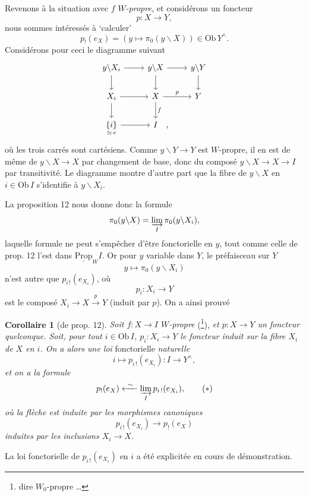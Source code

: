 Revenons à la situation avec $f$ \textit{$W$-propre,} et considérons un foncteur
\[
p : X \longrightarrow Y,
\]
nous sommes intéressés à ‘calculer’
\[
p_!(e_X) = (y \longmapsto \pi_0(y\backslash X)) \in \mathrm{Ob}\, Y^\wedge.
\]
Considérons pour ceci le diagramme suivant
\[
\begin{tikzcd}
y\backslash X_i \arrow[r] \arrow[d] & y\backslash X \arrow[r] \arrow[d] & y\backslash Y \arrow[d] \\
X_i \arrow[r] \arrow[d] & X \arrow[r, "p"] \arrow[d, "f"] & Y \\
\underset{\simeq\, e}{\{i\}} \arrow[r] & I\rlap{\quad ,} &
\end{tikzcd}
\]
où les trois carrés sont cartésiens. Comme $y\backslash Y \longrightarrow Y$ est $W$-propre, il en est de même de $y\backslash X \longrightarrow X$ par changement de base, donc du composé $y\backslash X \longrightarrow X \longrightarrow I$ par transitivité. Le diagramme montre d'autre part que la fibre de $y\backslash X$ en $i \in \mathrm{Ob}\, I$ s'identifie à $y\backslash X_i$.

La proposition 12 nous donne donc la formule
\[
\pi_0(y\backslash X) = \varinjlim_{I} \pi_0(y\backslash X_i),
\]
laquelle formule ne peut s'empêcher d'être fonctorielle en $y$, tout comme celle de prop. 12 l'est dans $\underline{\mathrm{Prop}}_W I$. Or pour $y$ variable dans $Y$, le préfaisceau sur $Y$
\[
y \longmapsto \pi_0(y\backslash X_i)
\]
n'est autre que $p_{i\,!}(e_{X_i})$, où
\[
p_i : X_i \longrightarrow Y
\]
est le composé $X_i \longrightarrow X \xrightarrow{p} Y$ (induit par $p$). On a ainsi prouvé

\textbf{Corollaire 1} (de prop. 12). \textit{Soit $f : X \longrightarrow I$ $W$-propre} (\footnote[82]{dire $W_0$-propre \dots}), \textit{et $p : X \longrightarrow Y$ un foncteur quelconque. Soit, pour tout $i \in \mathrm{Ob}\, I$, $p_i : X_i \longrightarrow Y$ le foncteur induit sur la fibre $X_i$ de $X$ en $i$. On a alors une loi} fonctorielle \textit{naturelle}
\[
i \longmapsto p_{i\,!}(e_{X_i}) : I \longrightarrow Y^\wedge,
\]
\textit{et on a la formule}
\[
p_!(e_X) \xleftarrow{\ \sim\ } \varinjlim_{I} p_{i\,!}(e_{X_i}), \tag*{$(*)$}
\]
\textit{où la flèche est induite par les morphismes canoniques}
\[
p_{i\,!}(e_{X_i}) \longrightarrow p_!(e_X)
\]
\textit{induites par les inclusions $X_i \longrightarrow X$.}

La loi fonctorielle de $p_{i\,!}(e_{X_i})$ en $i$ a été explicitée en cours de démonstration.

